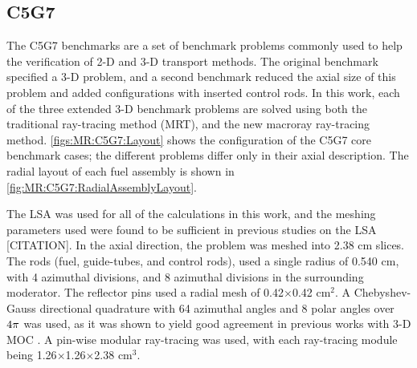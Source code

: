 {{    \subsection{C5G7}{\label{ssec:MR:C5G7}

      The C5G7 \cite{Smith2002,Smith2006} benchmarks are a set of benchmark problems commonly used to help the verification of 2-D and 3-D transport methods.
      The original benchmark specified a 3-D problem, and a second benchmark reduced the axial size of this problem and added configurations with inserted control rods.
      In this work, each of the three extended 3-D benchmark problems are solved using both the traditional ray-tracing method (\ac{MRT}), and the new macroray ray-tracing method.
      \cref{figs:MR:C5G7:Layout} shows the configuration of the C5G7 core benchmark cases; the different problems differ only in their axial description.
      The radial layout of each fuel assembly is shown in \cref{fig:MR:C5G7:RadialAssemblyLayout}.

      The \ac{LSA} was used for all of the calculations in this work, and the meshing parameters used were found to be sufficient in previous studies on the \ac{LSA} [CITATION].
      In the axial direction, the problem was meshed into 2.38 cm slices.
      The rods (fuel, guide-tubes, and control rods), used a single radius of 0.540 cm, with 4 azimuthal divisions, and 8 azimuthal divisions in the surrounding moderator.
      The reflector pins used a radial mesh of 0.42$\times$0.42 cm$^2$.
      A Chebyshev-Gauss directional quadrature with 64 azimuthal angles and 8 polar angles over $4\pi$ was used, as it was shown to yield good agreement in previous works with 3-D \ac{MOC} \cite{Kochunas2013}.
      A pin-wise modular ray-tracing was used, with each ray-tracing module being 1.26$\times$1.26$\times$2.38 cm$^3$.

}}}
